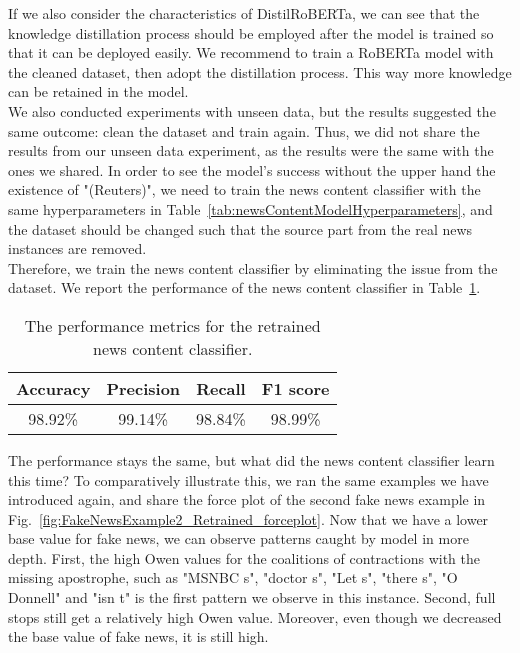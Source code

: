 If we also consider the characteristics of DistilRoBERTa, we can see that the knowledge distillation process should be employed after the model is trained so that it can be deployed easily. We recommend to train a RoBERTa model with the cleaned dataset, then adopt the distillation process. This way more knowledge can be retained in the model.\\
We also conducted experiments with unseen data, but the results suggested the same outcome: clean the dataset and train again. Thus, we did not share the results from our unseen data experiment, as the results were the same with the ones we shared. In order to see the model's success without the upper hand the existence of "(Reuters)", we need to train the news content classifier with the same hyperparameters in Table~\ref{tab:newsContentModelHyperparameters}, and the dataset should be changed such that the source part from the real news instances are removed. \\
Therefore, we train the news content classifier by eliminating the issue from the dataset. We report the performance of the news content classifier in Table~\ref{tab:newsContentModelRetrainedPerformanceMetrics}.
\begin{table}
    \centering
    \begin{tabular}{c | c | c | c}
        \textbf{Accuracy} & \textbf{Precision} & \textbf{Recall} & \textbf{F1 score} \\
        \hline
        98.92\%           & 99.14\%            & 98.84\%         & 98.99\%           \\
    \end{tabular}
    \caption[The performance metrics for the retrained news content classifier.]{The performance metrics for the retrained news content classifier.}
    \label{tab:newsContentModelRetrainedPerformanceMetrics}
\end{table}
The performance stays the same, but what did the news content classifier learn this time? To comparatively illustrate this, we ran the same examples we have introduced again, and share the force plot of the second fake news example in Fig.~\ref{fig:FakeNewsExample2_Retrained_forceplot}. Now that we have a lower base value for fake news, we can observe patterns caught by model in more depth. First, the high Owen values for the coalitions of contractions with the missing apostrophe, such as "MSNBC s", "doctor s", "Let s", "there s", "O Donnell" and "isn t" is the first pattern we observe in this instance. Second, full stops still get a relatively high Owen value. Moreover, even though we decreased the base value of fake news, it is still high.

